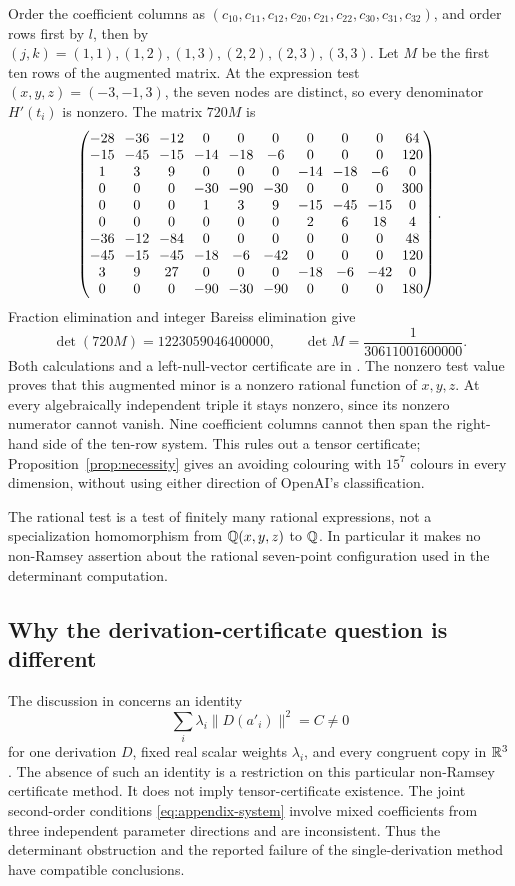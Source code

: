 Order the coefficient columns as
$(c_{10},c_{11},c_{12},c_{20},c_{21},c_{22},c_{30},c_{31},c_{32})$,
and order rows first by $l$, then by
$(j,k)=(1,1),(1,2),(1,3),(2,2),(2,3),(3,3)$.
Let $M$ be the first ten rows of the augmented matrix. At the
expression test $(x,y,z)=(-3,-1,3)$, the seven nodes are distinct,
so every denominator $H'(t_i)$ is nonzero. The matrix $720M$ is
\[
\setlength{\arraycolsep}{3.5pt}
\begin{pmatrix}
-28&-36&-12&0&0&0&0&0&0&64\\
-15&-45&-15&-14&-18&-6&0&0&0&120\\
1&3&9&0&0&0&-14&-18&-6&0\\
0&0&0&-30&-90&-30&0&0&0&300\\
0&0&0&1&3&9&-15&-45&-15&0\\
0&0&0&0&0&0&2&6&18&4\\
-36&-12&-84&0&0&0&0&0&0&48\\
-45&-15&-45&-18&-6&-42&0&0&0&120\\
3&9&27&0&0&0&-18&-6&-42&0\\
0&0&0&-90&-30&-90&0&0&0&180
\end{pmatrix}.
\]
Fraction elimination and integer Bareiss elimination give
\begin{equation}\label{eq:appendix-determinant}
 \det(720M)=1223059046400000,\qquad
 \det M=\frac1{30611001600000}.
\end{equation}
Both calculations and a left-null-vector certificate are in
. The nonzero test value proves
that this augmented minor is a nonzero rational function of
$x,y,z$. At every algebraically independent triple it stays
nonzero, since its nonzero numerator cannot vanish. Nine coefficient
columns cannot then span the right-hand side of the ten-row system.
This rules out a tensor certificate; Proposition~\ref{prop:necessity}
gives an avoiding colouring with $15^7$ colours in every dimension,
without using either direction of OpenAI's classification.

The rational test is a test of finitely many rational expressions,
not a specialization homomorphism from $\mathbb Q(x,y,z)$ to $\mathbb Q$.
In particular it makes no non-Ramsey assertion about the rational
seven-point configuration used in the determinant computation.

\subsection{Why the derivation-certificate question is different}
The discussion in \cite[Appendix~E, after Theorem~A.8]{palvolgyi2026}
concerns an identity
\[
 \sum_i\lambda_i\|D(a'_i)\|^2=C\ne0
\]
for one derivation $D$, fixed real scalar weights $\lambda_i$,
and every congruent copy in $\mathbb R^3$. The absence of such an identity
is a restriction on this particular non-Ramsey certificate method.
It does not imply tensor-certificate existence. The joint
second-order conditions \eqref{eq:appendix-system} involve mixed
coefficients from three independent parameter directions and are
inconsistent. Thus the determinant obstruction and the reported
failure of the single-derivation method have compatible conclusions.
